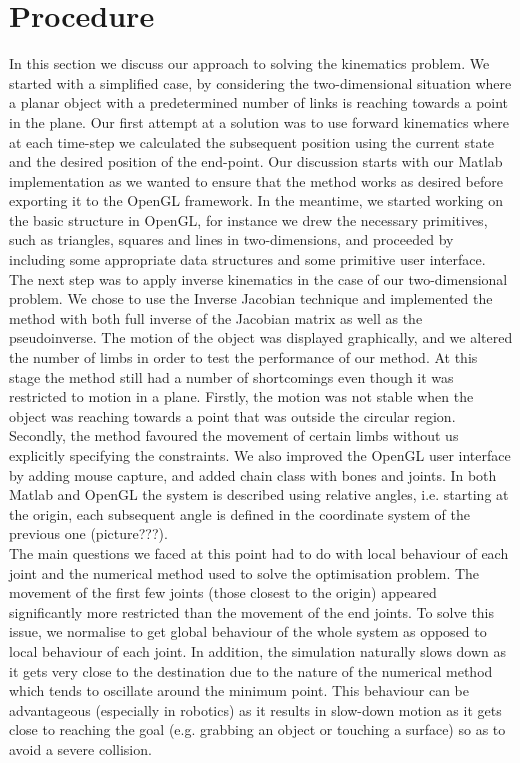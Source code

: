 \documentclass[paper=a4, fontsize=11pt]{scrartcl} %
\numberwithin{equation}{section} %
\numberwithin{figure}{section} %
\numberwithin{table}{section} %
\begin{document}
\section{Procedure}
In this section we discuss our approach to solving the kinematics problem. We started with a simplified case, by considering the two-dimensional situation where a planar object with a predetermined number of links is reaching towards a point in the plane. Our first attempt at a solution was to use forward kinematics where at each time-step we calculated the subsequent position using the current state and the desired position of the end-point. Our discussion starts with our Matlab implementation as we wanted to ensure that the method works as desired before exporting it to the OpenGL framework. In the meantime, we started working on the basic structure in OpenGL, for instance we drew the necessary primitives, such as triangles, squares and lines in two-dimensions, and proceeded by including some appropriate data structures and some primitive user interface. \\

The next step was to apply inverse kinematics in the case of our two-dimensional problem. We chose to use the Inverse Jacobian technique and implemented the method with both full inverse of the Jacobian matrix as well as the pseudoinverse. The motion of the object was displayed graphically, and we altered the number of limbs in order to test the performance of our method. At this stage the method still had a number of shortcomings even though it was restricted to motion in a plane. Firstly, the motion was not stable when the object was reaching towards a point that was outside the circular region. Secondly, the method favoured the movement of certain limbs without us explicitly specifying the constraints. We also improved the OpenGL user interface by adding mouse capture, and added chain class with bones and joints. In both Matlab and OpenGL the system is described using relative angles, i.e. starting at the origin, each subsequent angle is defined in the coordinate system of the previous one (picture???). \\

The main questions we faced at this point had to do with local behaviour of each joint and the numerical method used to solve the optimisation problem. The movement of the first few joints (those closest to the origin) appeared significantly more restricted than the movement of the end joints. To solve this issue, we normalise to get global behaviour of the whole system as opposed to local behaviour of each joint. In addition, the simulation naturally slows down as it gets very close to the destination due to the nature of the numerical method which tends to oscillate around the minimum point. This behaviour can be advantageous (especially in robotics) as it results in slow-down motion as it gets close to reaching the goal (e.g. grabbing an object or touching a surface) so as to avoid a severe collision. \\
\end{document}
